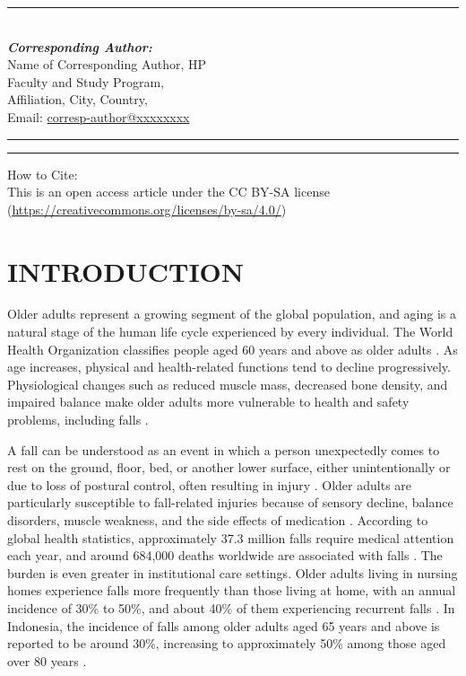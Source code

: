 \documentclass[10pt,TimesNewRoman,a4paper]{matrikenglish}
\begin{document}
\noindent
	\parbox[l]{\textwidth}{%
	\rule{\textwidth}{0.5pt}
	\\
	\emph{\textbf{Corresponding Author:}}
	\vspace{.5em}\\
	Name of Corresponding Author, HP\\
	Faculty and Study Program,\\
	Affiliation, City, Country,\\
	Email: {\href{mailto:corresp-author@xxxxxxxx}{corresp-author@xxxxxxxx}}\\
	
}
\hrule
\vspace{.1em}
\hrule
\vspace{1cm}
\noindent
How to Cite:\\
This is an open access article under the CC BY-SA license (\href{https://creativecommons.org/licenses/by-sa/4.0/}{\underline{https://creativecommons.org/licenses/by-sa/4.0/}})

\newpage

\section{INTRODUCTION}
\label{}

Older adults represent a growing segment of the global population, and aging is a natural stage of the human life cycle experienced by every individual. The World Health Organization classifies people aged 60 years and above as older adults \cite{Gusti2023}. As age increases, physical and health-related functions tend to decline progressively. Physiological changes such as reduced muscle mass, decreased bone density, and impaired balance make older adults more vulnerable to health and safety problems, including falls \cite{Colon2018}.

A fall can be understood as an event in which a person unexpectedly comes to rest on the ground, floor, bed, or another lower surface, either unintentionally or due to loss of postural control, often resulting in injury \cite{Forrest2012}. Older adults are particularly susceptible to fall-related injuries because of sensory decline, balance disorders, muscle weakness, and the side effects of medication \cite{Colon2024}. According to global health statistics, approximately 37.3 million falls require medical attention each year, and around 684,000 deaths worldwide are associated with falls \cite{Who2021}. The burden is even greater in institutional care settings. Older adults living in nursing homes experience falls more frequently than those living at home, with an annual incidence of 30\% to 50\%, and about 40\% of them experiencing recurrent falls \cite{ACEBAC2023}. In Indonesia, the incidence of falls among older adults aged 65 years and above is reported to be around 30\%, increasing to approximately 50\% among those aged over 80 years \cite{Gusti2023}.
\end{document}
